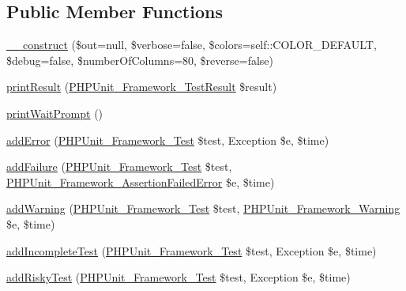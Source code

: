 \subsection*{Public Member Functions}
\begin{DoxyCompactItemize}
\item 
\mbox{\hyperlink{class_p_h_p_unit___text_u_i___result_printer_ae4e0dee58dda71835e8dcb2f92f04046}{\+\_\+\+\_\+construct}} (\$out=null, \$verbose=false, \$colors=self\+::\+C\+O\+L\+O\+R\+\_\+\+D\+E\+F\+A\+U\+LT, \$debug=false, \$number\+Of\+Columns=80, \$reverse=false)
\item 
\mbox{\hyperlink{class_p_h_p_unit___text_u_i___result_printer_ae4d4a8638af5b91aaa55d983037baf78}{print\+Result}} (\mbox{\hyperlink{class_p_h_p_unit___framework___test_result}{P\+H\+P\+Unit\+\_\+\+Framework\+\_\+\+Test\+Result}} \$result)
\item 
\mbox{\hyperlink{class_p_h_p_unit___text_u_i___result_printer_a13f0f4528a886903320fb2480b17296d}{print\+Wait\+Prompt}} ()
\item 
\mbox{\hyperlink{class_p_h_p_unit___text_u_i___result_printer_a320d7bc7d2f9264ee7ba7aca6fd2df41}{add\+Error}} (\mbox{\hyperlink{interface_p_h_p_unit___framework___test}{P\+H\+P\+Unit\+\_\+\+Framework\+\_\+\+Test}} \$test, Exception \$e, \$time)
\item 
\mbox{\hyperlink{class_p_h_p_unit___text_u_i___result_printer_a668f17b68705c5c8686bac690a6f719d}{add\+Failure}} (\mbox{\hyperlink{interface_p_h_p_unit___framework___test}{P\+H\+P\+Unit\+\_\+\+Framework\+\_\+\+Test}} \$test, \mbox{\hyperlink{class_p_h_p_unit___framework___assertion_failed_error}{P\+H\+P\+Unit\+\_\+\+Framework\+\_\+\+Assertion\+Failed\+Error}} \$e, \$time)
\item 
\mbox{\hyperlink{class_p_h_p_unit___text_u_i___result_printer_a6c3d134992c5b03573561ef82e7f743d}{add\+Warning}} (\mbox{\hyperlink{interface_p_h_p_unit___framework___test}{P\+H\+P\+Unit\+\_\+\+Framework\+\_\+\+Test}} \$test, \mbox{\hyperlink{class_p_h_p_unit___framework___warning}{P\+H\+P\+Unit\+\_\+\+Framework\+\_\+\+Warning}} \$e, \$time)
\item 
\mbox{\hyperlink{class_p_h_p_unit___text_u_i___result_printer_a81bfe09a62194fe5769ca1cc36ee428b}{add\+Incomplete\+Test}} (\mbox{\hyperlink{interface_p_h_p_unit___framework___test}{P\+H\+P\+Unit\+\_\+\+Framework\+\_\+\+Test}} \$test, Exception \$e, \$time)
\item 
\mbox{\hyperlink{class_p_h_p_unit___text_u_i___result_printer_ad161e7d13b117cb0af3967cd2adc6bba}{add\+Risky\+Test}} (\mbox{\hyperlink{interface_p_h_p_unit___framework___test}{P\+H\+P\+Unit\+\_\+\+Framework\+\_\+\+Test}} \$test, Exception \$e, \$time)

\end{DoxyCompactItemize}
